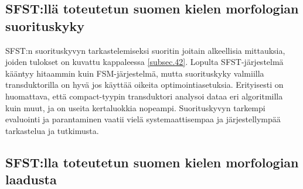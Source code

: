\documentclass[free]{flammie}
\begin{document}
\subsection{SFST:llä toteutetun suomen kielen morfologian suorituskyky}

SFST:n suorituskyvyn tarkastelemiseksi suoritin joitain alkeellisia mittauksia,
joiden tulokset on kuvattu kappaleessa \ref{subsec.42}. Lopulta SFST-järjestelmä kääntyy hitaammin kuin FSM-järjestelmä, mutta suorituskyky valmiilla transduktorilla
on hyvä jos käyttää oikeita optimointiasetuksia. Erityisesti on huomattava, että
compact-tyypin transduktori analysoi dataa eri algoritmilla kuin muut, ja on useita kertaluokkia nopeampi.
Suorituskyvyn tarkempi evaluointi ja parantaminen vaatii vielä systemaattisempaa
ja järjestellympää tarkastelua ja tutkimusta.

\subsection{SFST:lla toteutetun suomen kielen morfologian laadusta}
\end{document}
